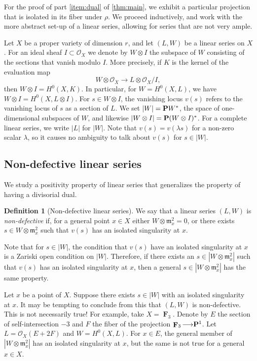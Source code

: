 \documentclass[11pt,reqno]{amsart}
\theoremstyle{plain}
\theoremstyle{definition}
\newtheorem{definition}[theorem]{Definition}
\theoremstyle{remark}
\numberwithin{equation}{section}
\DeclareMathOperator{\F}{\mathbf F}
\renewcommand{\to}{{\longrightarrow}}
\numberwithin{equation}{section}
\renewcommand{\O}{\mathcal O}
\begin{document}
For the proof of part \eqref{item:dual} of \autoref{thm:main}, we exhibit a particular projection that is isolated in its fiber under $\rho$.
We proceed inductively, and work with the more abstract set-up of a linear series, allowing for series that are not very ample.

Let $X$ be a proper variety of dimension $r$, and let $(L, W)$ be a linear series on $X$.
For an ideal sheaf $I \subset \O_X$ we denote by $W \otimes I$ the subspace of $W$ consisting of the sections that vanish modulo $I$. %
More precisely, if $K$ is the kernel of the evaluation map
\[ W \otimes \O_X \to L \otimes \O_X/I,\]
then $W \otimes I = H^0(X, K)$.
In particular, for $W = H^0(X, L)$, we have $W \otimes I = H^0(X, L \otimes I)$.
For $s \in W \otimes I$, the vanishing locus $v(s)$ refers to the vanishing locus of $s$ as a section of $L$.
We set $|W| = \P W^*$, the space of one-dimensional subspaces of $W$, and likewise $|W \otimes I| = \P (W \otimes I)^*$.
For a complete linear series, we write $|L|$ for $|W|$.
Note that $v(s) = v(\lambda s)$ for a non-zero scalar $\lambda$, so it causes no ambiguity to talk about $v(s)$ for $s \in |W|$.

\subsection{Non-defective linear series}\label{sec:non-defectivity}
We study a positivity property of linear series that generalizes the property of having a divisorial dual.
\begin{definition}[Non-defective linear series]
  \label{def:genericallynon-defective} 
  We say that a linear series $(L, W)$ is \emph{non-defective} if,  for a general point $x \in X$ either $W \otimes \mathfrak m_x^2 = 0$, or there exists $s \in W \otimes \mathfrak m_x^2$ such that $v(s)$ has an isolated singularity at $x$.
\end{definition}
Note that for $s \in |W|$, the condition that $v(s)$ have an isolated singularity at $x$ is a Zariski open condition on $|W|$.
Therefore, if there exists an $s \in |W \otimes \mathfrak m_x^2|$ such that $v(s)$ has an isolated singularity at $x$, then a general $s \in |W \otimes \mathfrak m_x^2|$ has the same property.
\begin{remark}
  Let $x$ be a point of $X$.
  Suppose there exists $s \in |W|$ with an isolated singularity at $x$.
  It may be tempting to conclude from this that $(L, W)$ is non-defective.
  This is not necessarily true!
  For example, take $X = \F_3$.
  Denote by $E$ the section of self-intersection $-3$ and $F$ the fiber of the projection $\F_3 \to \P^1$.
  Let $L = \O_X(E + 2F)$ and $W = H^0(X, L)$.
  For $x \in E$, the general member of $|W \otimes \mathfrak m_x^2|$ has an isolated singularity at $x$, but the same is not true for a general $x \in X$.
\end{remark}
\end{document}
